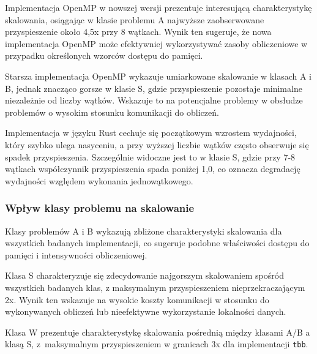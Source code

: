 Implementacja OpenMP w nowszej wersji prezentuje interesującą charakterystykę skalowania, osiągając w klasie problemu A najwyższe zaobserwowane przyspieszenie około 4,5x przy 8 wątkach. Wynik ten sugeruje, że nowa implementacja OpenMP może efektywniej wykorzystywać zasoby obliczeniowe w przypadku określonych wzorców dostępu do pamięci.

Starsza implementacja OpenMP wykazuje umiarkowane skalowanie w klasach A i B, jednak znacząco gorsze w klasie S, gdzie przyspieszenie pozostaje minimalne niezależnie od liczby wątków. Wskazuje to na potencjalne problemy w obsłudze problemów o wysokim stosunku komunikacji do obliczeń.

Implementacja w języku Rust cechuje się początkowym wzrostem wydajności, który szybko ulega nasyceniu, a przy wyższej liczbie wątków często obserwuje się spadek przyspieszenia. Szczególnie widoczne jest to w klasie S, gdzie przy 7-8 wątkach współczynnik przyspieszenia spada poniżej 1,0, co oznacza degradację wydajności względem wykonania jednowątkowego.

\subsubsection{Wpływ klasy problemu na skalowanie}
Klasy problemów A i B wykazują zbliżone charakterystyki skalowania dla wszystkich badanych implementacji, co sugeruje podobne właściwości dostępu do pamięci i intensywności obliczeniowej.

Klasa S charakteryzuje się zdecydowanie najgorszym skalowaniem spośród wszystkich badanych klas, z maksymalnym przyspieszeniem nieprzekraczającym 2x. Wynik ten wskazuje na wysokie koszty komunikacji w stosunku do wykonywanych obliczeń lub nieefektywne wykorzystanie lokalności danych.

Klasa W prezentuje charakterystykę skalowania pośrednią między klasami A/B a klasą S, z~maksymalnym przyspieszeniem w granicach 3x dla implementacji \texttt{tbb}.


